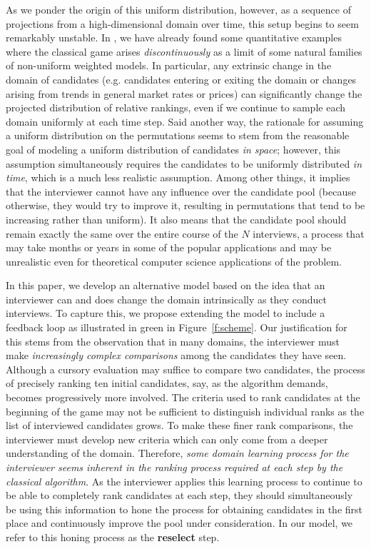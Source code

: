 \documentclass[11pt]{amsart}   %
\theoremstyle{definition}
\theoremstyle{remark}
\numberwithin{equation}{section}
\theoremstyle{theorem}
\begin{document}
As we ponder the origin of this uniform distribution, however, as a sequence of
projections from a high-dimensional domain over time, this setup begins to seem
remarkably unstable.  In \cite{weighted}, we have already found some
quantitative examples where the classical game arises {\em discontinuously} as
a limit of some natural families of non-uniform weighted models.  In
particular, any extrinsic change in the domain of candidates (e.g.  candidates
entering or exiting the domain or changes arising from trends in general market
rates or prices) can significantly change the projected distribution of
relative rankings, even if we continue to sample each domain uniformly at each
time step.  Said another way, the rationale for assuming a uniform distribution
on the permutations seems to stem from the reasonable goal of modeling a
uniform distribution of candidates {\em in space}; however, this assumption
simultaneously requires the candidates to be uniformly distributed {\em in
time}, which is a much less realistic assumption.  Among other things, it
implies that the interviewer cannot have any influence over the candidate pool
(because otherwise, they would try to improve it, resulting in permutations
that tend to be increasing rather than uniform).  It also means that the
candidate pool should remain exactly the same over the entire course of the $N$
interviews, a process that may take months or years in some of the popular
applications and may be unrealistic even for theoretical computer science
applications of the problem.

In this paper, we develop an alternative model based on the idea that an
interviewer can and does change the domain intrinsically as they conduct
interviews.  To capture this, we propose extending the model to include a
feedback loop as illustrated in green in Figure~\ref{f:scheme}.  Our
justification for this stems from the observation that in many domains, the
interviewer must make {\em increasingly complex comparisons} among the
candidates they have seen.  Although a cursory evaluation may suffice to
compare two candidates, the process of precisely ranking ten initial
candidates, say, as the algorithm demands, becomes progressively more involved.
The criteria used to rank candidates at the beginning of the game may not be
sufficient to distinguish individual ranks as the list of interviewed
candidates grows.  To make these finer rank comparisons, the interviewer must
develop new criteria which can only come from a deeper understanding of the
domain.  Therefore, {\em some domain learning process for the interviewer seems
inherent in the ranking process required at each step by the classical
algorithm}.  As the interviewer applies this learning process to continue to be
able to completely rank candidates at each step, they should simultaneously be
using this information to hone the process for obtaining candidates in the
first place and continuously improve the pool under consideration.  In our
model, we refer to this honing process as the {\bf reselect} step.
\end{document}
